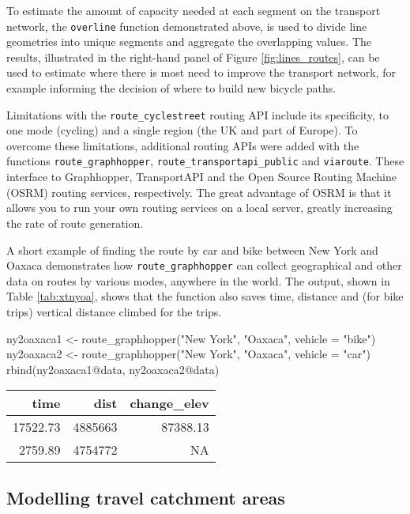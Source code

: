 To estimate the amount of capacity needed at each segment on the
transport network, the \texttt{overline} function demonstrated above, is
used to divide line geometries into unique segments and aggregate the
overlapping values. The results, illustrated in the right-hand panel of
Figure \ref{fig:lines_routes}, can be used to estimate where there is
most need to improve the transport network, for example informing the
decision of where to build new bicycle paths.

Limitations with the \texttt{route\_cyclestreet} routing API include its
specificity, to one mode (cycling) and a single region (the UK and part
of Europe). To overcome these limitations, additional routing APIs were
added with the functions \texttt{route\_graphhopper},
\texttt{route\_transportapi\_public} and \texttt{viaroute}. These
interface to Graphhopper, TransportAPI and the Open Source Routing
Machine (OSRM) routing services, respectively. The great advantage of
OSRM is that it allows you to run your own routing services on a local
server, greatly increasing the rate of route generation.

A short example of finding the route by car and bike between New York
and Oaxaca demonstrates how \texttt{route\_graphhopper} can collect
geographical and other data on routes by various modes, anywhere in the
world. The output, shown in Table \ref{tab:xtnyoa}, shows that the
function also saves time, distance and (for bike trips) vertical
distance climbed for the trips.

\begin{Schunk}
\begin{Sinput}
ny2oaxaca1 <- route_graphhopper("New York", "Oaxaca", vehicle = "bike")
ny2oaxaca2 <- route_graphhopper("New York", "Oaxaca", vehicle = "car")
rbind(ny2oaxaca1@data, ny2oaxaca2@data)
\end{Sinput}
\end{Schunk}

\begin{longtable}[]{@{}rrr@{}}
\toprule
time & dist & change\_elev\tabularnewline
\midrule
\endhead
17522.73 & 4885663 & 87388.13\tabularnewline
2759.89 & 4754772 & NA\tabularnewline
\bottomrule
\end{longtable}

\subsection{Modelling travel catchment
areas}\label{modelling-travel-catchment-areas}

